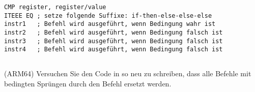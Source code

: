 \begin{lstlisting}[caption=ARM (\ThumbMode),style=customasmARM]
CMP register, register/value
ITEEE EQ ; setze folgende Suffixe: if-then-else-else-else
instr1   ; Befehl wird ausgeführt, wenn Bedingung wahr ist
instr2   ; Befehl wird ausgeführt, wenn Bedingung falsch ist
instr3   ; Befehl wird ausgeführt, wenn Bedingung falsch ist
instr4   ; Befehl wird ausgeführt, wenn Bedingung falsch ist
\end{lstlisting}

\subsection{\Exercise}
(ARM64) Versuchen Sie den Code in  so neu zu schreiben, dass
alle Befehle mit bedingten Sprüngen durch den  Befehl ersetzt werden.

